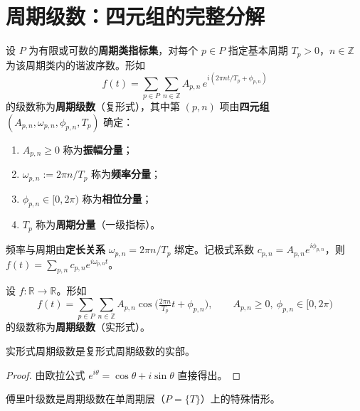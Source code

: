 \section{\texorpdfstring{周期级数：四元组的完整分解}{周期级数}}

\begin{definition}\label{def:periodic_series}
设 $P$ 为有限或可数的\textbf{周期类指标集}，对每个 $p \in P$ 指定基本周期 $T_p > 0$，$n \in \mathbb{Z}$ 为该周期类内的谐波序数。形如
\[
f(t) = \sum_{p \in P} \sum_{n \in \mathbb{Z}} A_{p,n}\, e^{i(2\pi n t / T_p + \phi_{p,n})}
\]
的级数称为\textbf{周期级数}（复形式），其中第 $(p,n)$ 项由\textbf{四元组} $(A_{p,n}, \omega_{p,n}, \phi_{p,n}, T_p)$ 确定：
\begin{enumerate}[label=(\roman*)]
    \item $A_{p,n} \ge 0$ 称为\textbf{振幅分量}；
    \item $\omega_{p,n} := 2\pi n / T_p$ 称为\textbf{频率分量}；
    \item $\phi_{p,n} \in [0, 2\pi)$ 称为\textbf{相位分量}；
    \item $T_p$ 称为\textbf{周期分量}（一级指标）。
\end{enumerate}
频率与周期由\textbf{定长关系} $\omega_{p,n} = 2\pi n / T_p$ 绑定。记极式系数 $c_{p,n} = A_{p,n} e^{i\phi_{p,n}}$，则 $f(t) = \sum_{p,n} c_{p,n} e^{i\omega_{p,n} t}$。
\end{definition}

\begin{definition}\label{def:periodic_series_real}
设 $f: \mathbb{R} \to \mathbb{R}$。形如
\[
f(t) = \sum_{p \in P} \sum_{n \in \mathbb{Z}} A_{p,n} \cos\!\big( \tfrac{2\pi n}{T_p} t + \phi_{p,n} \big), \qquad A_{p,n} \ge 0,\ \phi_{p,n} \in [0, 2\pi)
\]
的级数称为\textbf{周期级数}（实形式）。
\end{definition}

\begin{proposition}[实形式与复形式的等价]\label{prop:periodic_series_real_complex}
实形式周期级数是复形式周期级数的实部。
\end{proposition}

\begin{proof}
由欧拉公式 $e^{i\theta} = \cos\theta + i\sin\theta$ 直接得出。
\end{proof}

\begin{proposition}[傅里叶级数是周期级数的特殊情形]\label{prop:fourier_as_periodic_series}
傅里叶级数是周期级数在单周期层（$P = \{T\}$）上的特殊情形。
\end{proposition}

